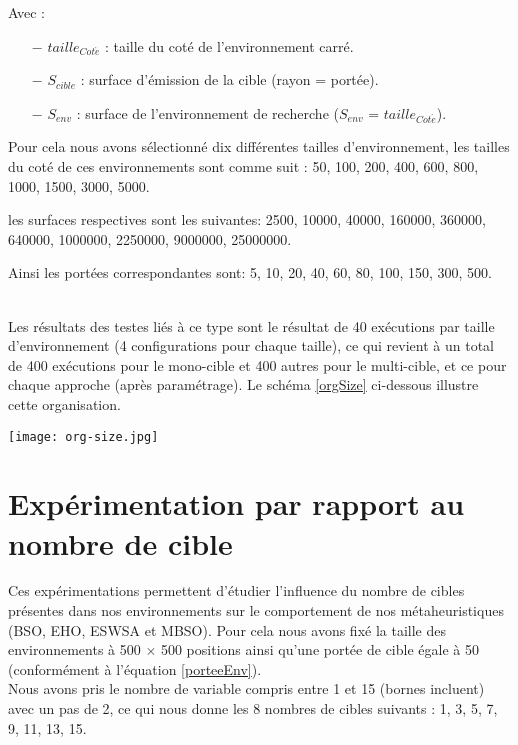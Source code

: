 Avec :
\begin{itemize}
	\item[$-$] $taille_{Cot\acute{e}}$ : taille du coté de l'environnement carré.
	\item[$-$] $S_{cible}$ : surface d'émission de la cible (rayon = portée).
	\item[$-$] $S_{env}$ : surface de l'environnement de recherche ($S_{env}$ = $taille_{Cot\acute{e}}$).\\
\end{itemize}

Pour cela nous avons sélectionné dix différentes tailles d'environnement, les tailles du coté de ces environnements sont comme suit : 50, 100, 200, 400, 600, 800, 1000, 1500, 3000, 5000.

les surfaces respectives sont les suivantes: 2500, 10000, 40000, 160000, 360000, 640000, 1000000, 2250000, 9000000, 25000000.

Ainsi les portées correspondantes sont: 5, 10, 20, 40, 60, 80, 100, 150, 300, 500.


\textbf{ }\\
Les résultats des testes liés à ce type sont le résultat de 40 exécutions par taille d'environnement (4 configurations pour chaque taille), ce qui revient à un total de 400 exécutions pour le mono-cible et 400 autres pour le multi-cible, et ce pour chaque approche (après paramétrage). Le schéma \ref{orgSize} ci-dessous illustre cette organisation.

\begin{center}	  
	\texttt{[image: org-size.jpg]}%
	\vspace{-0.1 cm}
	\label{orgSize}%
\end{center}

\section{Expérimentation par rapport au nombre de cible}
Ces expérimentations permettent d'étudier l'influence du nombre de cibles présentes dans nos environnements sur le comportement de nos métaheuristiques (BSO, EHO, ESWSA et MBSO).
Pour cela nous avons fixé la taille des environnements à 500 $\times$ 500 positions ainsi qu'une portée de cible égale à 50 (conformément à l'équation \ref{porteeEnv}).\\

Nous avons pris le nombre de variable compris entre 1 et 15 (bornes incluent) avec un pas de 2, ce qui nous donne les 8 nombres de cibles suivants : 1, 3, 5, 7, 9, 11, 13, 15.\\

